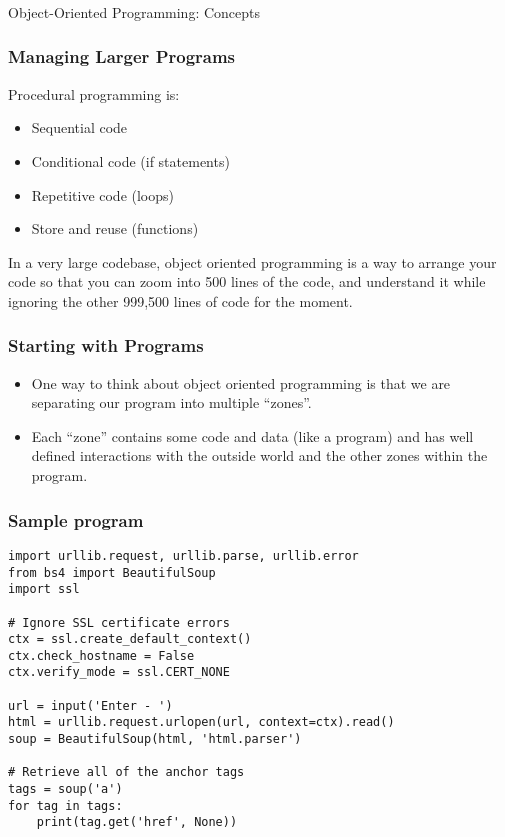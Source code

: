 \begin{frame}[fragile]\frametitle{}
\begin{center}
{\Large Object-Oriented Programming: Concepts}
\end{center}
\end{frame}

\begin{frame}[fragile] \frametitle{Managing Larger Programs}
Procedural programming is:
\begin{itemize}
\item  Sequential code
\item  Conditional code (if statements)
\item  Repetitive code (loops)
\item  Store and reuse (functions)
\end{itemize}
In a very large codebase, object oriented programming is a way to arrange your code so that you
can zoom into 500 lines of the code, and understand it while ignoring the other
999,500 lines of code for the moment.
\end{frame}


\begin{frame}[fragile]\frametitle{Starting with Programs}
\begin{itemize}
\item One way to think about object oriented programming is that we are separating
our program into multiple ``zones''.
\item Each ``zone'' contains some code and data (like a program) and has well defined interactions with the outside world and the other
zones within the program.
\end{itemize}
\end{frame}

\begin{frame}[fragile]\frametitle{Sample program}
\begin{lstlisting}
import urllib.request, urllib.parse, urllib.error
from bs4 import BeautifulSoup
import ssl

# Ignore SSL certificate errors
ctx = ssl.create_default_context()
ctx.check_hostname = False
ctx.verify_mode = ssl.CERT_NONE

url = input('Enter - ')
html = urllib.request.urlopen(url, context=ctx).read()
soup = BeautifulSoup(html, 'html.parser')

# Retrieve all of the anchor tags
tags = soup('a')
for tag in tags:
	print(tag.get('href', None))
\end{lstlisting}
\end{frame}

